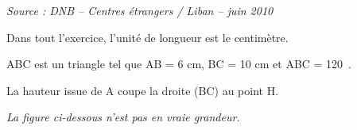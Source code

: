 \documentclass[11pt,a4paper]{article}
\newcommand{\source}[1]{%
    \begin{flushright}
        \small\itshape Source : #1
    \end{flushright}
}
\begin{document}
\source{DNB -- Centres étrangers / Liban -- juin 2010}

Dans tout l'exercice, l'unité de longueur est le centimètre.

\medskip

ABC est un triangle tel que AB = 6 cm, BC = 10 cm et ABC = 120~\degres.

La hauteur issue de A coupe la droite (BC) au point H.

\emph{La figure ci-dessous n'est pas en vraie grandeur.}

\medskip

\begin{center}
\end{center}

\medskip
\end{document}
